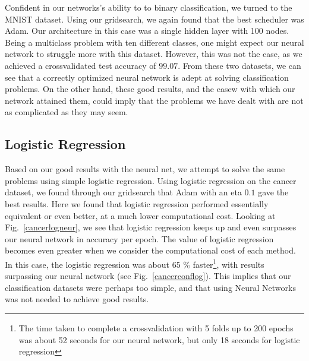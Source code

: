 \documentclass[onecolumn,10pt,cleanfoot]{asme2ej}
\begin{document}
Confident in our networks's ability to to binary classification, we turned to the MNIST dataset. Using our gridsearch, we again found that the best scheduler was Adam. Our architecture in this case was a single hidden layer with 100 nodes. Being a multiclass problem with ten different classes, one might expect our neural network to struggle more with this dataset. However, this was not the case, as we achieved a crossvalidated test accuracy of $99.07$. From these two datasets, we can see that a correctly optimized neural network is adept at solving classification problems. On the other hand, these good results, and the easew with which our network attained them, could imply that the problems we have dealt with are not as complicated as they may seem.

\subsection{Logistic Regression}

Based on our good results with the neural net, we attempt to solve the same problems using simple logistic regression. Using logistic regression on the cancer dataset, we found through our gridsearch that Adam with an eta $0.1$ gave the best results. Here we found that logistic regression performed essentially equivalent or even better, at a much lower computational cost. Looking at Fig.~\ref{cancerlogneur}, we see that logistic regression keeps up and even surpasses our neural network in accuracy per epoch. The value of logistic regression becomes even greater when we consider the computational cost of each method. In this case, the logistic regression was about 65 \% faster\footnote{The time taken to complete a crossvalidation with 5 folds up to 200 epochs was about 52 seconds for our neural network, but only 18 seconds for logistic regression}, with results surpassing our neural network (see Fig.~\ref{cancerconflog}). This implies that our classification datasets were perhaps too simple, and that using Neural Networks was not needed to achieve good results.
\end{document}
